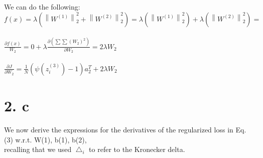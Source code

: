 \documentclass[
	12pt, %
]{fphw}
\begin{document}
We can do the following:\\

$f(x) = \lambda\left(\left\|W^{(1)}\right\|_{2}^{2}+\left\|W^{(2)}\right\|_{2}^{2}\right) = \lambda\left(\left\|W^{(1)}\right\|_{2}^{2}\right) + \lambda\left(\left\|W^{(2)}\right\|_{2}^{2}\right) = $\\ \\

$\frac{\partial f(x)}{W_2} = 0 + \lambda \frac{\partial(\sum\sum(W_2)^2)}{\partial W_2} = 2\lambda W_2$\\ \\

$\frac{\partial J}{\partial W_2} = \frac{1}{N} (\psi(z_{i}^{(3)}) - 1) a_{2}^{T} + 2\lambda W_2$


\newpage
\section* {2. c}

We now derive the expressions for the derivatives of the regularized loss in Eq. (3) w.r.t. W(1), b(1), b(2),\\
recalling that we used $\bigtriangleup_i$ to refer to the Kronecker delta. \\
\end{document}
